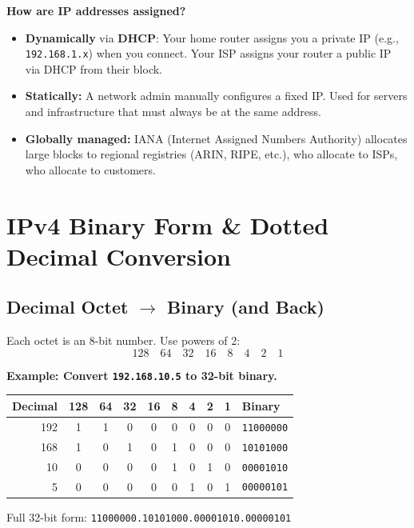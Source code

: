 \documentclass[11pt, letterpaper]{article}
\begin{document}
\textbf{How are IP addresses assigned?}
\begin{itemize}[noitemsep]
  \item \textbf{Dynamically} via \textbf{DHCP}: Your home router assigns you a private IP
        (e.g., \texttt{192.168.1.x}) when you connect. Your ISP assigns your router a public
        IP via DHCP from their block.
  \item \textbf{Statically:} A network admin manually configures a fixed IP. Used for servers
        and infrastructure that must always be at the same address.
  \item \textbf{Globally managed:} IANA (Internet Assigned Numbers Authority) allocates large
        blocks to regional registries (ARIN, RIPE, etc.), who allocate to ISPs, who allocate
        to customers.
\end{itemize}

\section*{IPv4 Binary Form \& Dotted Decimal Conversion}

\subsection*{Decimal Octet $\to$ Binary (and Back)}

Each octet is an 8-bit number. Use powers of 2:
\[
  128 \quad 64 \quad 32 \quad 16 \quad 8 \quad 4 \quad 2 \quad 1
\]

\begin{tcolorbox}[colback=partbg, colframe=sectionblue, arc=3pt, boxrule=1pt]
\textbf{Example: Convert \texttt{192.168.10.5} to 32-bit binary.}
\begin{center}
\renewcommand{\arraystretch}{1.3}
\begin{tabular}{r|cccccccc|l}
\toprule
\textbf{Decimal} & 128 & 64 & 32 & 16 & 8 & 4 & 2 & 1 & \textbf{Binary} \\
\midrule
192 & 1 & 1 & 0 & 0 & 0 & 0 & 0 & 0 & \texttt{11000000} \\
168 & 1 & 0 & 1 & 0 & 1 & 0 & 0 & 0 & \texttt{10101000} \\
 10 & 0 & 0 & 0 & 0 & 1 & 0 & 1 & 0 & \texttt{00001010} \\
  5 & 0 & 0 & 0 & 0 & 0 & 1 & 0 & 1 & \texttt{00000101} \\
\bottomrule
\end{tabular}
\end{center}
Full 32-bit form: \texttt{11000000.10101000.00001010.00000101}
\end{tcolorbox}
\end{document}

